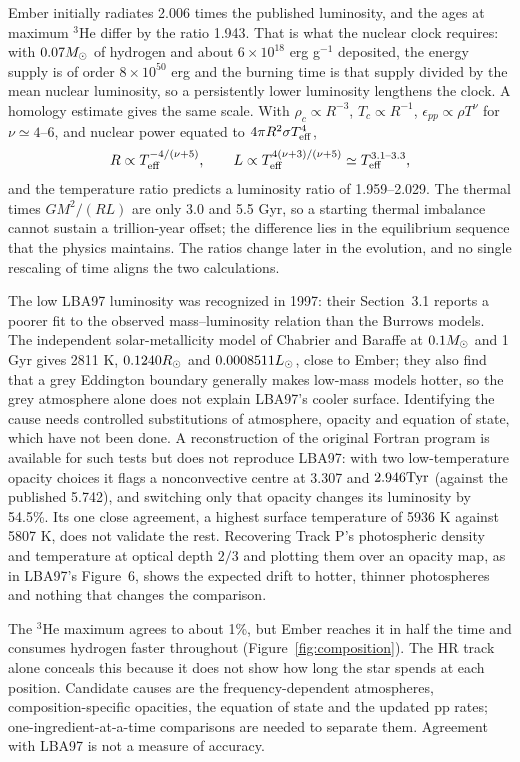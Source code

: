 Ember initially radiates 2.006 times the published luminosity, and the ages
at maximum $^3$He differ by the ratio 1.943. That is what the nuclear clock
requires: with $0.07M_\odot$ of hydrogen and about $6\times10^{18}$ erg g$^{-1}$
deposited, the energy supply is of order $8\times10^{50}$ erg and the
burning time is that supply divided by the mean nuclear luminosity, so a
persistently lower luminosity lengthens the clock. A homology estimate gives
the same scale. With $\rho_c\propto R^{-3}$, $T_c\propto R^{-1}$,
$\epsilon_{pp}\propto\rho T^\nu$ for $\nu\simeq4$--6, and nuclear power
equated to $4\pi R^2\sigma T_{\rm eff}^4$,
\[
R\propto T_{\rm eff}^{-4/(\nu+5)},\qquad
L\propto T_{\rm eff}^{4(\nu+3)/(\nu+5)}\simeq T_{\rm eff}^{3.1\text{--}3.3},
\]
and the temperature ratio predicts a luminosity ratio of 1.959--2.029. The
thermal times $GM^2/(RL)$ are only 3.0 and 5.5 Gyr, so a starting thermal
imbalance cannot sustain a trillion-year offset; the difference lies in the
equilibrium sequence that the physics maintains. The ratios change later in
the evolution, and no single rescaling of time aligns the two calculations.

The low LBA97 luminosity was recognized in 1997: their Section~3.1 reports a
poorer fit to the observed mass--luminosity relation than the Burrows
models. The independent solar-metallicity model of Chabrier and Baraffe
\cite{chabrier97} at $0.1M_\odot$ and 1 Gyr gives 2811 K, $0.1240R_\odot$ and
$0.0008511L_\odot$, close to Ember; they also find that a grey Eddington
boundary generally makes low-mass models hotter, so the grey atmosphere
alone does not explain LBA97's cooler surface. Identifying the cause needs
controlled substitutions of atmosphere, opacity and equation of state, which
have not been done. A reconstruction of the original Fortran program is
available for such tests but does not reproduce LBA97: with two
low-temperature opacity choices it flags a nonconvective centre at 3.307 and
$2.946\mathrm{Tyr}$ (against the published 5.742), and switching only that opacity
changes its luminosity by 54.5\%. Its one close agreement, a highest surface
temperature of 5936 K against 5807 K, does not validate the rest.
Recovering Track P's photospheric density and temperature at optical depth
$2/3$ and plotting them over an opacity map, as in LBA97's Figure~6, shows
the expected drift to hotter, thinner photospheres and nothing that changes
the comparison.

The $^3$He maximum agrees to about 1\%, but Ember reaches it in half the
time and consumes hydrogen faster throughout (Figure~\ref{fig:composition}).
The HR track alone conceals this because it does not show how long the star
spends at each position. Candidate causes are the frequency-dependent
atmospheres, composition-specific opacities, the equation of state and the
updated pp rates; one-ingredient-at-a-time comparisons are needed to
separate them. Agreement with LBA97 is not a measure of accuracy.

